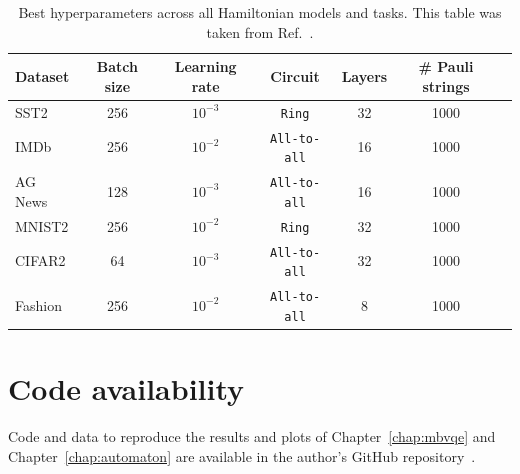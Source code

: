\documentclass[../main.tex]{subfiles}
\begin{document}
\begin{table}
\begin{tabular}{lcccccc}
\textbf{Dataset} & \textbf{Batch size} & \textbf{Learning rate} & \textbf{Circuit} & \textbf{Layers} & \textbf{\# Pauli strings} \\
\midrule
SST2 & 256 & $10^{-3}$ & \texttt{Ring} & 32 & 1000 \\
IMDb & 256 & $10^{-2}$ & \texttt{All-to-all} & 16 & 1000 \\
AG News & 128 & $10^{-3}$ & \texttt{All-to-all} & 16 & 1000 \\
MNIST2 & 256 & $10^{-2}$ & \texttt{Ring} & 32 & 1000 \\
CIFAR2 & 64 & $10^{-3}$ & \texttt{All-to-all} & 32 & 1000 \\
Fashion & 256 & $10^{-2}$ & \texttt{All-to-all} & 8 & 1000 \\
\bottomrule
\end{tabular}
\caption{Best hyperparameters across all Hamiltonian models and tasks. This table was taken from Ref.~\cite{tiblias2025an}.}
\label{tab:hyp-ham}
\end{table}

\section{Code availability}

Code and data to reproduce the results and plots of Chapter~\ref{chap:mbvqe} and Chapter~\ref{chap:automaton} are available in the author's GitHub repository~\cite{schroeder2026quantumthesis}.
\end{document}
